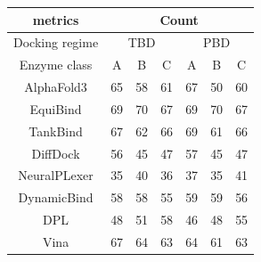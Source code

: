 \documentclass[12pt, a4paper, portrait]{article}
\begin{document}
    \begin{table}
        \begin{tabular}{|c|*{6}{c}}
            \hline
            metrics & \multicolumn{6}{|c|}{Count} \\
            \hline

            Docking regime & \multicolumn{3}{|c|}{TBD} & \multicolumn{3}{|c|}{PBD} \\
            \hline

            Enzyme class & A & B & C & A & B & C \\
            AlphaFold3&65&58&61&67&50&60\\ 
            EquiBind&69&70&67&69&70&67\\ 
            TankBind&67&62&66&69&61&66\\ 
            DiffDock&56&45&47&57&45&47\\ 
            NeuralPLexer&35&40&36&37&35&41\\ 
            DynamicBind&58&58&55&59&59&56\\ 
            DPL&48&51&58&46&48&55\\ 
            Vina&67&64&63&64&61&63\\ 

        \end{tabular}
    \end{table}
\end{document}
